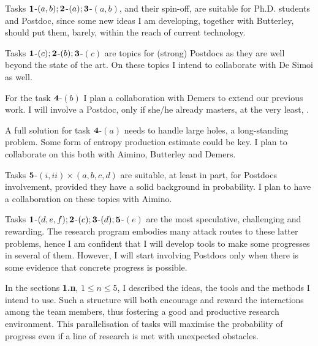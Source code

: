 \documentclass[10pt, a4paper, reqno]{amsart}
\begin{document}
Tasks ${\bf 1}$-$(a,b); {\bf 2}$-$(a); {\bf 3}$-$(a,b)$, and their spin-off, are suitable for Ph.D. students and Postdoc, since some new ideas I am developing, together with Butterley, should put them, barely, within the reach of current technology. 

Tasks  ${\bf 1}$-$(c); {\bf 2}$-$(b); {\bf 3}$-$(c)$ are topics for (strong) Postdocs as they are well beyond the state of the art. On these topics I intend to collaborate with De Simoi as well.  

For the task  ${\bf 4}$-$(b)$ I plan a collaboration with Demers to extend our previous work. I will involve a Postdoc, only if she/he already masters, at the very least, \cite{CM06}. 

A full solution for task ${\bf 4}$-$(a)$ needs to handle large holes, a long-standing problem. Some form of entropy production estimate could be key. I plan to collaborate on this both with Aimino, Butterley and Demers. 

Tasks ${\bf 5}$-$(i,ii)\times (a,b,c,d)$ are suitable, at least in part, for Postdocs involvement, provided they have a solid background in probability. I plan to have a collaboration on these topics with Aimino. 

Tasks ${\bf 1}$-$(d, e,f); {\bf 2}$-$(c); {\bf 3}$-$(d); {\bf 5}$-$(e)$ are the most speculative, challenging and rewarding. The research program embodies many attack routes to these latter problems, hence I am confident that I will develop tools to make some progresses in several of them. However, I will start involving Postdocs only when there is some evidence that concrete progress is possible.


In the sections {\bf\color{red} 1.n}, $1\leq n \leq 5$, I described the ideas, the tools and the methods I intend to use. Such a structure will both encourage and reward the interactions among the team members, thus fostering a good and productive research environment. This parallelisation of tasks will maximise the probability of progress even if a line of research is met with unexpected obstacles.


\end{document}
